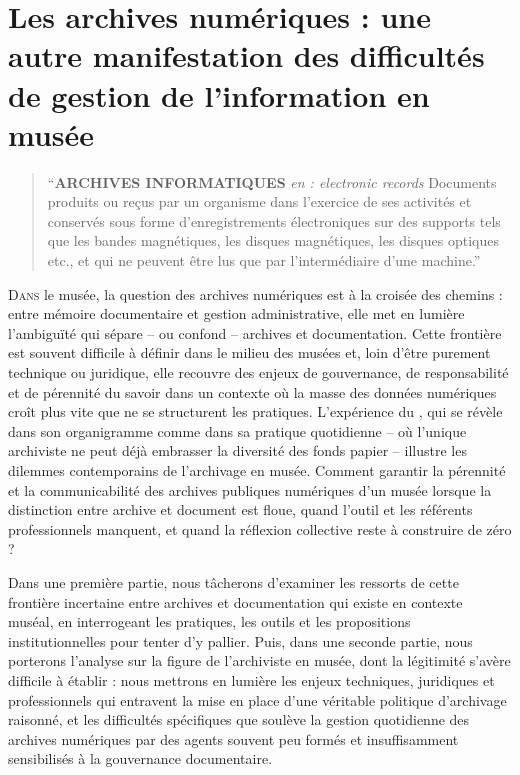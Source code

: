 \chapter[PDV métier]{\label{II-C}Les archives numériques : une autre manifestation des difficultés de gestion de l’information en musée }

\begin{quote}
	\enquote{\textbf{ARCHIVES INFORMATIQUES} \textit{en : electronic records}
		Documents produits ou reçus par un organisme dans l'exercice de
		ses activités et conservés sous forme d'enregistrements
		électroniques sur des supports tels que les bandes magnétiques,
		les disques magnétiques, les disques optiques etc., et qui ne
		peuvent être lus que par l’intermédiaire d’une machine.}
\end{quote}

\lettrine{D}{ans} le musée, la question des archives numériques est à la croisée des chemins : entre mémoire documentaire et gestion administrative, elle met en lumière l’ambiguïté qui sépare – ou confond – archives et documentation. Cette frontière est souvent difficile à définir dans le milieu des musées et, loin d’être purement technique ou juridique, elle recouvre des enjeux de gouvernance, de responsabilité et de pérennité du savoir dans un contexte où la masse des données numériques croît plus vite que ne se structurent les pratiques. L’expérience du \mae, qui se révèle dans son organigramme comme dans sa pratique quotidienne – où l’unique archiviste ne peut déjà embrasser la diversité des fonds papier – illustre les dilemmes contemporains de l’archivage en musée. Comment garantir la pérennité et la communicabilité des archives publiques numériques d'un musée lorsque la distinction entre archive et document est floue, quand l’outil et les référents professionnels manquent, et quand la réflexion collective reste à construire de zéro ? 

Dans une première partie, nous tâcherons d'examiner les ressorts de cette frontière incertaine entre archives et documentation qui existe en contexte muséal, en interrogeant les pratiques, les outils et les propositions institutionnelles pour tenter d'y pallier. Puis, dans une seconde partie, nous porterons l’analyse sur la figure de l’archiviste en musée, dont la légitimité s’avère difficile à établir : nous mettrons en lumière les enjeux techniques, juridiques et professionnels qui entravent la mise en place d’une véritable politique d’archivage raisonné, et les difficultés spécifiques que soulève la gestion quotidienne des archives numériques par des agents souvent peu formés et insuffisamment sensibilisés à la gouvernance documentaire.

